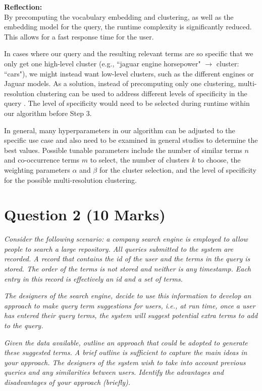 \textbf{Reflection:}\\
By precomputing the vocabulary embedding and clustering, as well as the embedding model for the query, the runtime complexity is significantly reduced. This allows for a fast response time for the user.

In cases where our query and the resulting relevant terms are so specific that we only get one high-level cluster (e.g., ``jaguar engine horsepower" $\rightarrow$ cluster: ``cars"), we might instead want low-level clusters, such as the different engines or Jaguar models. As a solution, instead of precomputing only one clustering, multi-resolution clustering can be used to address different levels of specificity in the query \cite{lutov2019accuracy}. The level of specificity would need to be selected during runtime within our algorithm before Step 3.

In general, many hyperparameters in our algorithm can be adjusted to the specific use case and also need to be examined in general studies to determine the best values. Possible tunable parameters include the number of similar terms $n$ and co-occurrence terms $m$ to select, the number of clusters $k$ to choose, the weighting parameters $\alpha$ and $\beta$ for the cluster selection, and the level of specificity for the possible multi-resolution clustering.



\newpage
\section{Question 2 (10 Marks)}

\textit{Consider the following scenario: a company search engine is employed to allow people to search a large repository. All queries submitted to the system are recorded. A record that contains the id of the user and the terms in the query is stored. The order of the terms is not stored and neither is any timestamp. Each entry in this record is effectively an id and a set of terms.}

\textit{The designers of the search engine, decide to use this information to develop an approach to make query term suggestions for users, i.e., at run time, once a user has entered their query terms, the system will suggest potential extra terms to add to the query.}

\textit{Given the data available, outline an approach that could be adopted to generate these suggested terms. A brief outline is sufficient to capture the main ideas in your approach. The designers of the system wish to take into account previous queries and any similarities between users. Identify the advantages and disadvantages of your approach (briefly).}

